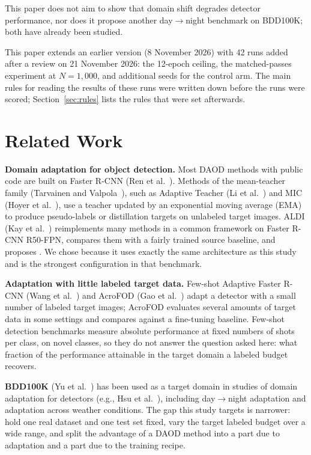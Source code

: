 This paper does not aim to show that domain shift degrades detector performance, nor does it propose another day$\to$night benchmark on BDD100K; both have already been studied.

This paper extends an earlier version (8 November 2026) with 42 runs added after a review on 21 November 2026: the 12-epoch ceiling, the matched-passes experiment at $N = 1{,}000$, and additional seeds for the control arm. The main rules for reading the results of these runs were written down before the runs were scored; Section~\ref{sec:rules} lists the rules that were set afterwards.

\section{Related Work}\label{sec:related}

\textbf{Domain adaptation for object detection.} Most DAOD methods with public code are built on Faster R-CNN (Ren et al.~\cite{ren2015faster}). Methods of the mean-teacher family (Tarvainen and Valpola~\cite{tarvainen2017mean}), such as Adaptive Teacher (Li et al.~\cite{li2022adaptive}) and MIC (Hoyer et al.~\cite{hoyer2023mic}), use a teacher updated by an exponential moving average (EMA) to produce pseudo-labels or distillation targets on unlabeled target images. ALDI (Kay et al.~\cite{kay2024aldi}) reimplements many methods in a common framework on Faster R-CNN R50-FPN, compares them with a fairly trained source baseline, and proposes \aldi. We chose \aldi because it uses exactly the same architecture as this study and is the strongest configuration in that benchmark.

\textbf{Adaptation with little labeled target data.} Few-shot Adaptive Faster R-CNN (Wang et al.~\cite{wang2019fewshot}) and AcroFOD (Gao et al.~\cite{gao2022acrofod}) adapt a detector with a small number of labeled target images; AcroFOD evaluates several amounts of target data in some settings and compares against a fine-tuning baseline. Few-shot detection benchmarks measure absolute performance at fixed numbers of shots per class, on novel classes, so they do not answer the question asked here: what fraction of the performance attainable in the target domain a labeled budget recovers.

\textbf{BDD100K} (Yu et al.~\cite{yu2020bdd100k}) has been used as a target domain in studies of domain adaptation for detectors (e.g., Hsu et al.~\cite{hsu2020progressive}), including day$\to$night adaptation and adaptation across weather conditions. The gap this study targets is narrower: hold one real dataset and one test set fixed, vary the target labeled budget over a wide range, and split the advantage of a DAOD method into a part due to adaptation and a part due to the training recipe.
